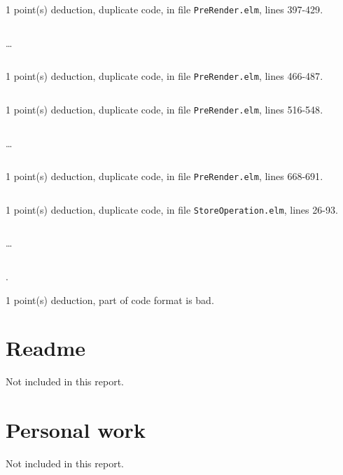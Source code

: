 \documentclass{article}
\begin{document}
\inputminted[firstline=255,lastline=274]{elm}{PreRender.elm}

1 point(s) {\color{red}deduction}, duplicate code, in file {\color{blue}\texttt{PreRender.elm}}, lines {\color{blue}397-429}.

\inputminted[firstline=397,lastline=406]{elm}{PreRender.elm}

\dots

\inputminted[firstline=420,lastline=429]{elm}{PreRender.elm}

1 point(s) {\color{red}deduction}, duplicate code, in file {\color{blue}\texttt{PreRender.elm}}, lines {\color{blue}466-487}.

\inputminted[firstline=466,lastline=487]{elm}{PreRender.elm}

1 point(s) {\color{red}deduction}, duplicate code, in file {\color{blue}\texttt{PreRender.elm}}, lines {\color{blue}516-548}.

\inputminted[firstline=516,lastline=525]{elm}{PreRender.elm}

\dots

\inputminted[firstline=539,lastline=548]{elm}{PreRender.elm}

1 point(s) {\color{red}deduction}, duplicate code, in file {\color{blue}\texttt{PreRender.elm}}, lines {\color{blue}668-691}.

\inputminted[firstline=668,lastline=691]{elm}{PreRender.elm}

1 point(s) {\color{red}deduction}, duplicate code, in file {\color{blue}\texttt{StoreOperation.elm}}, lines {\color{blue}26-93}.

\inputminted[firstline=26,lastline=35]{elm}{StoreOperation.elm}

\dots

\inputminted[firstline=84,lastline=93]{elm}{StoreOperation.elm}

.\medskip

1 point(s) {\color{red}deduction}, part of code format is bad.\medskip



\newpage

\section{Readme}

Not included in this report.

\section{Personal work}

Not included in this report.


\newpage
\end{document}

